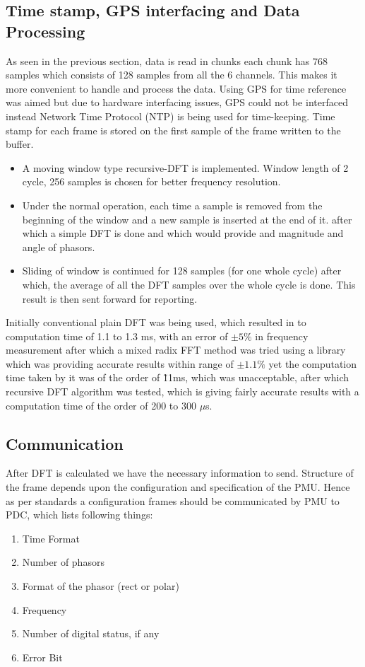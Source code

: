 \subsection{Time stamp, GPS interfacing and Data Processing }
As seen in the previous section, data is read in chunks each chunk has 768 samples which consists of 128 samples from all the 6 channels. This makes it more convenient to handle and process the data. Using GPS for time reference was aimed but due to hardware interfacing issues, GPS could not be interfaced instead Network Time Protocol (NTP) is being used for time-keeping. Time stamp for each frame is stored on the first sample of the frame written to the buffer.

\begin{itemize}
	\item A moving window type recursive-DFT is implemented. Window length of 2 cycle, 256 samples is chosen for better frequency resolution.
	\item Under the normal operation, each time a sample is removed from the beginning of the window and a new sample is inserted at the end of it. after which a simple DFT is done and which would provide and magnitude and angle of phasors.
	\item Sliding of window is continued for 128 samples (for one whole cycle) after which, the average of all the DFT samples over the whole cycle is done. This result is then sent forward for reporting.
\end{itemize} 

Initially conventional plain DFT was being used, which resulted in to computation time of 1.1 to 1.3 ms, with an error of $\pm 5 \%$ in frequency measurement after which a mixed radix FFT method was tried using a library \cite{kissFFT} which was providing accurate results within range of $\pm1.1\% $ yet the computation time taken by it was of the order of \~11ms, which was unacceptable, after which recursive DFT algorithm was tested, which is giving fairly accurate results with a computation time of the order of 200 to 300 $\mu$s.



\subsection{Communication}

After DFT is calculated we have the necessary information to send. Structure of the frame depends upon the configuration and specification of the PMU. Hence as per standards a configuration frames should be communicated by PMU to PDC, which lists following things:
\begin{enumerate}
	\item Time Format 
	\item Number of phasors
	\item Format of the phasor (rect or polar)
	\item Frequency
	\item Number of digital status, if any
	\item Error Bit
\end{enumerate}

